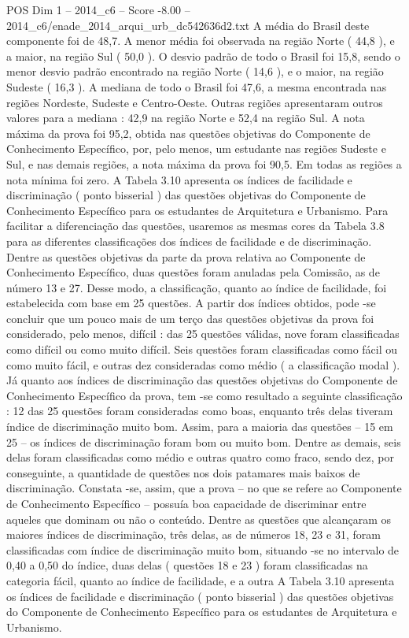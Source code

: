 \begin{textsample}{POS Dim 1 – 2014\_c6 – Score -8.00 – 2014\_c6/enade\_2014\_arqui\_urb\_dc542636d2.txt}
A média do Brasil deste componente foi de 48,7.
A menor média foi observada na região Norte ( 44,8 ), e a maior, na região Sul ( 50,0 ).
O desvio padrão de todo o Brasil foi 15,8, sendo o menor desvio padrão encontrado na região Norte ( 14,6 ), e o maior, na região Sudeste ( 16,3 ).
A mediana de todo o Brasil foi 47,6, a mesma encontrada nas regiões Nordeste, Sudeste e Centro-Oeste.
Outras regiões apresentaram outros valores para a mediana : 42,9 na região Norte e 52,4 na região Sul.
A nota máxima da prova foi 95,2, obtida nas questões objetivas do Componente de Conhecimento Específico, por, pelo menos, um estudante nas regiões Sudeste e Sul, e nas demais regiões, a nota máxima da prova foi 90,5.
Em todas as regiões a nota mínima foi zero.
A Tabela 3.10 apresenta os índices de facilidade e discriminação ( ponto bisserial ) das questões objetivas do Componente de Conhecimento Específico para os estudantes de Arquitetura e Urbanismo.
Para facilitar a diferenciação das questões, usaremos as mesmas cores da Tabela 3.8 para as diferentes classificações dos índices de facilidade e de discriminação.
Dentre as questões objetivas da parte da prova relativa ao Componente de Conhecimento Específico, duas questões foram anuladas pela Comissão, as de número 13 e 27.
Desse modo, a classificação, quanto ao índice de facilidade, foi estabelecida com base em 25 questões.
A partir dos índices obtidos, pode -se concluir que um pouco mais de um terço das questões objetivas da prova foi considerado, pelo menos, difícil : das 25 questões válidas, nove foram classificadas como difícil ou como muito difícil.
Seis questões foram classificadas como fácil ou como muito fácil, e outras dez consideradas como médio ( a classificação modal ).
Já quanto aos índices de discriminação das questões objetivas do Componente de Conhecimento Específico da prova, tem -se como resultado a seguinte classificação : 12 das 25 questões foram consideradas como boas, enquanto três delas tiveram índice de discriminação muito bom.
Assim, para a maioria das questões – 15 em 25 – os índices de discriminação foram bom ou muito bom.
Dentre as demais, seis delas foram classificadas como médio e outras quatro como fraco, sendo dez, por conseguinte, a quantidade de questões nos dois patamares mais baixos de discriminação.
Constata -se, assim, que a prova – no que se refere ao Componente de Conhecimento Específico – possuía boa capacidade de discriminar entre aqueles que dominam ou não o conteúdo.
Dentre as questões que alcançaram os maiores índices de discriminação, três delas, as de números 18, 23 e 31, foram classificadas com índice de discriminação muito bom, situando -se no intervalo de 0,40 a 0,50 do índice, duas delas ( questões 18 e 23 ) foram classificadas na categoria fácil, quanto ao índice de facilidade, e a outra A Tabela 3.10 apresenta os índices de facilidade e discriminação ( ponto bisserial ) das questões objetivas do Componente de Conhecimento Específico para os estudantes de Arquitetura e Urbanismo.

\end{textsample}
